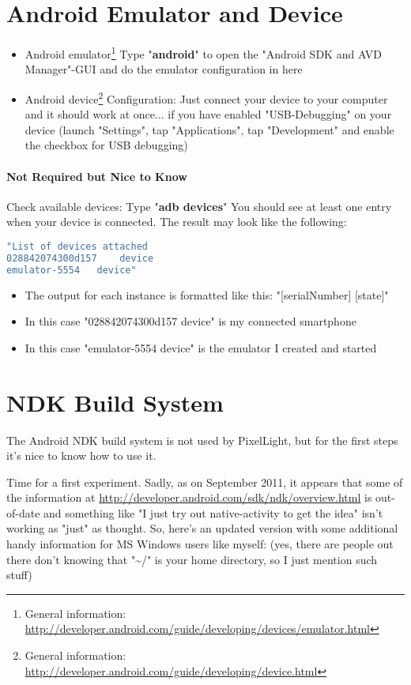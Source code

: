 \section{Android Emulator and Device}
\begin{itemize}
\item{Android emulator\footnote{General information: \url{http://developer.android.com/guide/developing/devices/emulator.html}} \textrightarrow  Type "\textbf{android}" to open the "Android SDK and AVD Manager"-GUI and do the emulator configuration in here}
\item{Android device\footnote{General information: \url{http://developer.android.com/guide/developing/device.html}} \textrightarrow  Configuration: Just connect your device to your computer and it should work at once... if you have enabled "USB-Debugging" on your device (launch "Settings", tap "Applications", tap "Development" and enable the checkbox for USB debugging)}
\end{itemize}


\paragraph{Not Required but Nice to Know}
Check available devices: Type "\textbf{adb devices}" \textrightarrow   You should see at least one entry when your device is connected. The result may look like the following:
\begin{lstlisting}[language=bash]
"List of devices attached
028842074300d157	device
emulator-5554	device"
\end{lstlisting}

\begin{itemize}
\item{The output for each instance is formatted like this: \textrightarrow  "[serialNumber] [state]"}
\item{In this case "028842074300d157	device" is my connected smartphone}
\item{In this case "emulator-5554	device" is the emulator I created and started}
\end{itemize}




\section{NDK Build System}
The Android NDK build system is not used by PixelLight, but for the first steps it's nice to know how to use it.

Time for a first experiment. Sadly, as on September 2011, it appears that some of the information at \url{http://developer.android.com/sdk/ndk/overview.html} is out-of-date and something like "I just try out native-activity to get the idea" isn't working as "just" as thought. So, here's an updated version with some additional handy information for MS Windows users like myself: (yes, there are people out there don't knowing that "\textasciitilde /" is your home directory, so I just mention such stuff)



